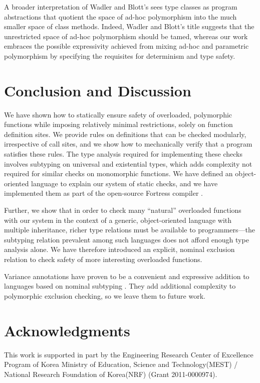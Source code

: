 \documentclass[10pt]{sigplanconf}
\begin{document}
A broader interpretation of Wadler and Blott's \cite{wadler89} sees type
classes as program abstractions that quotient the space of ad-hoc polymorphism
into the much smaller space of class methods. Indeed, Wadler and Blott's title
suggests that the unrestricted space of ad-hoc polymorphism should be tamed,
whereas our work embraces the possible expressivity achieved from mixing ad-hoc
and parametric polymorphism by specifying the requisites for determinism and type safety.


\section{Conclusion and Discussion}\label{sec:conclusion}
We have shown how to statically ensure safety of overloaded, polymorphic functions while imposing relatively minimal restrictions, solely on function definition sites. We provide rules on definitions that can be checked modularly, irrespective of call sites, and we show how to mechanically verify that a program satisfies these rules. The type analysis required for implementing these checks involves subtyping on universal and existential types, which adds complexity not required for similar checks on monomorphic functions. We have defined an object-oriented language to explain our system of static checks, and we have implemented them as part of the open-source Fortress compiler \cite{Fortress}.

Further, we show that in order to check many ``natural'' overloaded
functions with our system in the context of a generic, object-oriented
language with multiple inheritance,
richer type relations must be available to programmers---the subtyping relation prevalent among such languages does not afford enough type analysis alone. We have therefore introduced an explicit, nominal exclusion relation to check safety of more interesting overloaded functions.

Variance annotations have proven to be a convenient and expressive addition to languages based on nominal subtyping \cite{bourdoncle97,kennedy07,scala}. They add additional complexity to polymorphic exclusion checking, so we leave them to future work.


\section*{Acknowledgments}
This work is supported in part by the Engineering Research Center of Excellence Program of Korea Ministry of Education,
Science and Technology(MEST) / National Research Foundation of Korea(NRF)
(Grant 2011-0000974).




\end{document}
